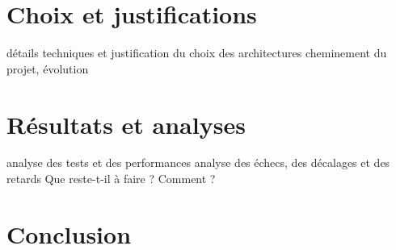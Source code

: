 \chapter{Choix et justifications}

détails techniques et justification du choix des architectures
cheminement du projet, évolution




\chapter{Résultats et analyses}

analyse des tests et des performances
analyse des échecs, des décalages et des retards
Que reste-t-il à faire ? Comment ?


\chapter{Conclusion}
